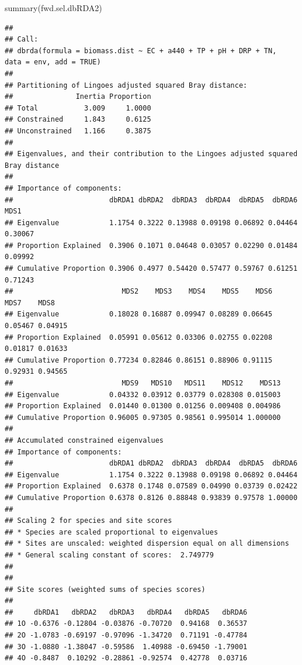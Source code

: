 \documentclass[
]{book}
\newenvironment{Shaded}{\begin{snugshade}}{\end{snugshade}}
\newcommand{\FunctionTok}[1]{\textcolor[rgb]{0.00,0.00,0.00}{#1}}
\newcommand{\NormalTok}[1]{#1}
\begin{document}
\begin{Shaded}
\begin{Highlighting}[]
\FunctionTok{summary}\NormalTok{(fwd.sel.dbRDA2)}
\end{Highlighting}
\end{Shaded}

\begin{verbatim}
## 
## Call:
## dbrda(formula = biomass.dist ~ EC + a440 + TP + pH + DRP + TN,      data = env, add = TRUE) 
## 
## Partitioning of Lingoes adjusted squared Bray distance:
##               Inertia Proportion
## Total           3.009     1.0000
## Constrained     1.843     0.6125
## Unconstrained   1.166     0.3875
## 
## Eigenvalues, and their contribution to the Lingoes adjusted squared Bray distance 
## 
## Importance of components:
##                       dbRDA1 dbRDA2  dbRDA3  dbRDA4  dbRDA5  dbRDA6    MDS1
## Eigenvalue            1.1754 0.3222 0.13988 0.09198 0.06892 0.04464 0.30067
## Proportion Explained  0.3906 0.1071 0.04648 0.03057 0.02290 0.01484 0.09992
## Cumulative Proportion 0.3906 0.4977 0.54420 0.57477 0.59767 0.61251 0.71243
##                          MDS2    MDS3    MDS4    MDS5    MDS6    MDS7    MDS8
## Eigenvalue            0.18028 0.16887 0.09947 0.08289 0.06645 0.05467 0.04915
## Proportion Explained  0.05991 0.05612 0.03306 0.02755 0.02208 0.01817 0.01633
## Cumulative Proportion 0.77234 0.82846 0.86151 0.88906 0.91115 0.92931 0.94565
##                          MDS9   MDS10   MDS11    MDS12    MDS13
## Eigenvalue            0.04332 0.03912 0.03779 0.028308 0.015003
## Proportion Explained  0.01440 0.01300 0.01256 0.009408 0.004986
## Cumulative Proportion 0.96005 0.97305 0.98561 0.995014 1.000000
## 
## Accumulated constrained eigenvalues
## Importance of components:
##                       dbRDA1 dbRDA2  dbRDA3  dbRDA4  dbRDA5  dbRDA6
## Eigenvalue            1.1754 0.3222 0.13988 0.09198 0.06892 0.04464
## Proportion Explained  0.6378 0.1748 0.07589 0.04990 0.03739 0.02422
## Cumulative Proportion 0.6378 0.8126 0.88848 0.93839 0.97578 1.00000
## 
## Scaling 2 for species and site scores
## * Species are scaled proportional to eigenvalues
## * Sites are unscaled: weighted dispersion equal on all dimensions
## * General scaling constant of scores:  2.749779 
## 
## 
## Site scores (weighted sums of species scores)
## 
##     dbRDA1   dbRDA2   dbRDA3   dbRDA4   dbRDA5   dbRDA6
## 1O -0.6376 -0.12804 -0.03876 -0.70720  0.94168  0.36537
## 2O -1.0783 -0.69197 -0.97096 -1.34720  0.71191 -0.47784
## 3O -1.0880 -1.38047 -0.59586  1.40988 -0.69450 -1.79001
## 4O -0.8487  0.10292 -0.28861 -0.92574  0.42778  0.03716

\end{verbatim}
\end{document}
